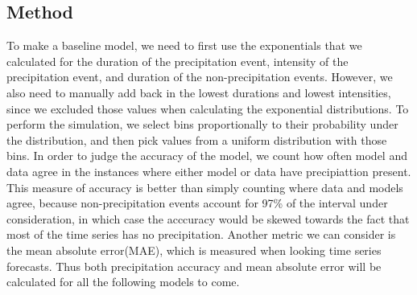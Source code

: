 \documentclass[11pt]{report}
\begin{document}
\subsection{Method}\label{sec:sfp_m}

To make a baseline model, we need to first use the exponentials that we
calculated for the duration of the precipitation event, intensity of the
precipitation event, and duration of the non-precipitation events. However,
we also need to manually add back in the lowest durations and lowest
intensities, since we excluded those values when calculating the exponential
distributions. To perform the simulation, we select bins proportionally to
their probability under the distribution, and then pick values from a
uniform distribution with those bins. In order to judge the accuracy of the
model, we count how often model and data agree in the instances where either
model or data have precipiattion present.  This measure of accuracy is
better than simply counting where data and models agree, because
non-precipitation events account for 97\% of the interval under
consideration, in which case the acccuracy would be skewed towards the fact
that most of the time series has no precipitation. 
Another metric we can consider is the mean absolute error(MAE), which is measured when looking time series forecasts. Thus both precipitation accuracy and mean absolute error will be calculated for all the following models to come. 
\end{document}
